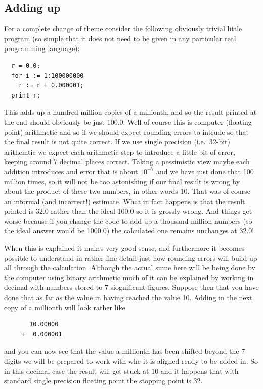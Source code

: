 \subsection{Adding up}
For a complete change of theme consider the following obviously
trivial little program (so simple that it does not need to be
given in any particular real programming language):
\begin{verbatim}
  r = 0.0;
  for i := 1:100000000
    r := r + 0.000001;
  print r;
\end{verbatim}
This adds up a hundred million copies of a  millionth, and
so the result printed at the end should obviously be just 100.0.
Well of course this is computer (floating point) arithmetic and
so if we should expect rounding errors to intrude so that the
final result is not quite correct. If we use single precision
(i.e.\ 32-bit) arithemtic we expect each arithmetic step to introduce
a little bit of error, keeping around 7 decimal places correct. Taking
a pessimistic view maybe each addition introduces and error that is about
$10^{-7}$ and we have just done that 100 million times, so it will not be
too astonishing if our final result is wrong by about the product
of these two numbers, in other words 10. That was of course an informal
(and incorrect!) estimate. What in fact happens is that the result
printed is 32.0 rather than the ideal 100.0 so it is grossly wrong.
And things get worse because if you change the code to add up a thousand
million numbers (so the ideal answer would be 1000.0) the calculated one
remains unchanges at 32.0!

When this is explained it makes very good sense, and furthermore it becomes
possible to understand in rather fine detail just how rounding errors will
build up all through the calculation. Although the actual sume here will
be being done by the computer using binary arithmetic much of it can be
explained by working in decimal with numbers stored to 7 siognificant
figures. Suppose then that you have done that as far as the value in
\verb@r@ having reached the value 10. Adding in the next copy of a millionth
will look rather like
\begin{verbatim}
       10.00000
     +  0.000001 
\end{verbatim}
and you can now see that the value a millionth has been shifted beyond
the 7 digits we will be prepared to work with whe it is aligned ready to
be added in. So in this decimal case the result will get stuck at 10 and
it happens that with standard single precision floating point the
stopping point is 32.

